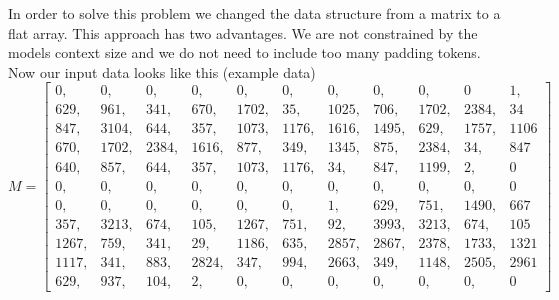 \documentclass[a4paper,12pt]{extarticle}
\begin{document}
In order to solve this problem we changed the data structure from a matrix to a flat array. This approach has two advantages. We are not constrained by the models context size and we do not need to include too many padding tokens. Now our input data looks like this (example data) \vspace{0.15cm}
\[
M =
\left[
\begin{array}{lllllllllll} 
0,      & 0,      & 0,      & 0,      & 0,      & 0,      & 0,      & 0,      & 0,      & 0       & 1,           \\
629,    & 961,    & 341,    & 670,    & 1702,   & 35,     & 1025,   & 706,    & 1702,   & 2384,   & 34     \\
847,    & 3104,   & 644,    & 357,    & 1073,   & 1176,   & 1616,   & 1495,   & 629,    & 1757,   & 1106   \\
670,    & 1702,   & 2384,   & 1616,   & 877,    & 349,    & 1345,   & 875,    & 2384,   & 34,     & 847    \\
640,    & 857,    & 644,    & 357,    & 1073,   & 1176,   & 34,     & 847,    & 1199,   & 2,      & 0      \\
0,      & 0,      & 0,      & 0,      & 0,      & 0,      & 0,      & 0,      & 0,      & 0,      & 0      \\
0,      & 0,      & 0,      & 0,      & 0,      & 0,      & 1,      & 629,    & 751,    & 1490,   & 667    \\
357,    & 3213,   & 674,    & 105,    & 1267,   & 751,    & 92,     & 3993,   & 3213,   & 674,    & 105    \\
1267,   & 759,    & 341,    & 29,     & 1186,   & 635,    & 2857,   & 2867,   & 2378,   & 1733,   & 1321   \\
1117,   & 341,    & 883,    & 2824,   & 347,    & 994,    & 2663,   & 349,    & 1148,   & 2505,   & 2961   \\
629,    & 937,    & 104,    & 2,      & 0,      & 0,      & 0,      & 0,      & 0,      & 0,      & 0
\end{array}
\right]
\]
\end{document}
